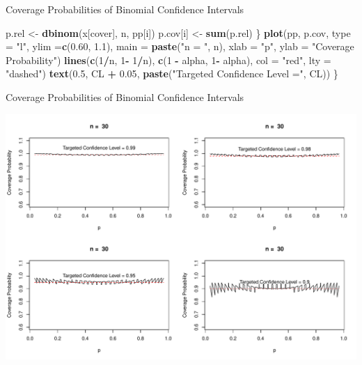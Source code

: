 \documentclass[
  ignorenonframetext,
]{beamer}
\newenvironment{Shaded}{\begin{snugshade}}{\end{snugshade}}
\newcommand{\AttributeTok}[1]{\textcolor[rgb]{0.13,0.29,0.53}{#1}}
\newcommand{\DecValTok}[1]{\textcolor[rgb]{0.00,0.00,0.81}{#1}}
\newcommand{\FloatTok}[1]{\textcolor[rgb]{0.00,0.00,0.81}{#1}}
\newcommand{\FunctionTok}[1]{\textcolor[rgb]{0.13,0.29,0.53}{\textbf{#1}}}
\newcommand{\NormalTok}[1]{#1}
\newcommand{\OtherTok}[1]{\textcolor[rgb]{0.56,0.35,0.01}{#1}}
\newcommand{\SpecialCharTok}[1]{\textcolor[rgb]{0.81,0.36,0.00}{\textbf{#1}}}
\newcommand{\StringTok}[1]{\textcolor[rgb]{0.31,0.60,0.02}{#1}}
\begin{document}
\begin{frame}[fragile]{Coverage Probabilities of Binomial Confidence
Intervals}
\begin{Shaded}
\begin{Highlighting}[]
\NormalTok{  p.rel }\OtherTok{\textless{}{-}} \FunctionTok{dbinom}\NormalTok{(x[cover], n, pp[i])}
\NormalTok{  p.cov[i] }\OtherTok{\textless{}{-}} \FunctionTok{sum}\NormalTok{(p.rel)}
\NormalTok{\}}
\FunctionTok{plot}\NormalTok{(pp, p.cov, }\AttributeTok{type =} \StringTok{"l"}\NormalTok{, }\AttributeTok{ylim =}\FunctionTok{c}\NormalTok{(}\FloatTok{0.60}\NormalTok{, }\FloatTok{1.1}\NormalTok{), }\AttributeTok{main =} \FunctionTok{paste}\NormalTok{(}\StringTok{"n = "}\NormalTok{, n), }
     \AttributeTok{xlab =} \StringTok{"p"}\NormalTok{, }\AttributeTok{ylab =} \StringTok{"Coverage Probability"}\NormalTok{)}
\FunctionTok{lines}\NormalTok{(}\FunctionTok{c}\NormalTok{(}\DecValTok{1}\SpecialCharTok{/}\NormalTok{n, }\DecValTok{1}\SpecialCharTok{{-}} \DecValTok{1}\SpecialCharTok{/}\NormalTok{n), }\FunctionTok{c}\NormalTok{(}\DecValTok{1} \SpecialCharTok{{-}}\NormalTok{ alpha, }\DecValTok{1}\SpecialCharTok{{-}}\NormalTok{ alpha), }\AttributeTok{col =} \StringTok{"red"}\NormalTok{, }\AttributeTok{lty =} \StringTok{"dashed"}\NormalTok{)}
      \FunctionTok{text}\NormalTok{(}\FloatTok{0.5}\NormalTok{, CL }\SpecialCharTok{+} \FloatTok{0.05}\NormalTok{, }\FunctionTok{paste}\NormalTok{(}\StringTok{"Targeted Confidence Level ="}\NormalTok{, CL))}
\NormalTok{\}}
\end{Highlighting}
\end{Shaded}

\normalsize
\end{frame}

\begin{frame}{Coverage Probabilities of Binomial Confidence Intervals}
\protect\hypertarget{coverage-probabilities-of-binomial-confidence-intervals-8}{}
\tiny

\begin{center}\includegraphics[width=0.9\linewidth,height=0.8\textheight]{Week11_12_13_files/figure-beamer/unnamed-chunk-19-1} \end{center}
\normalsize
\end{frame}
\end{document}
